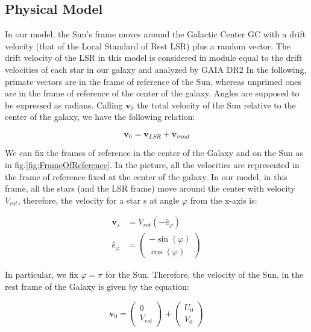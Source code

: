 \subsection{Physical Model}

In our model, the Sun's frame moves around the Galactic Center GC with a drift velocity (that of the Local Standard of Rest LSR) plus a random vector. The drift velocity of the LSR in this model is considered in module equal to the drift velocities of each star in our galaxy and analyzed by GAIA DR2
In the following, primate vectors are in the frame of reference of the Sun, whereas unprimed ones are in the frame of reference of the center of the galaxy. Angles are supposed to be expressed as radians. 
Calling $\bm{v}_0$ the total velocity of the Sun relative to the center of the galaxy, we have the following relation:

\begin{equation}\label{eq:SunVelocity}
    \bm{v}_0 = \bm{v}_{LSR} + \bm{v}_{rand}
\end{equation}

\noindent
We can fix the frames of reference in the center of the Galaxy and on the Sun as in fig.\ref{fig:FrameOfReference}. In the picture, all the velocities are represented in the frame of reference fixed at the center of the galaxy. In our model, in this frame, all the stars (and the LSR frame) move around the center with velocity $V_{rot}$, therefore, the velocity for a star s at angle $\varphi$ from the x-axis is:

\begin{equation}\label{eq:VComponents}
    \begin{aligned}
        \bm{v}_s &= V_{rot} (-\hat{e}_{\varphi}) \\
        \hat{e}_{\varphi} &= \begin{pmatrix} -\sin(\varphi) \\ \cos(\varphi) \end{pmatrix}
    \end{aligned}
\end{equation}

\noindent
In particular, we fix $\varphi = \pi$ for the Sun. Therefore, the velocity of the Sun, in the rest frame of the Galaxy is given by the equation:

\begin{equation}\label{eq:VSun}
    \bm{v}_0 = \begin{pmatrix} 0 \\ V_{rot} \end{pmatrix} + \begin{pmatrix} U_0 \\ V_0 \end{pmatrix}
\end{equation}
 
